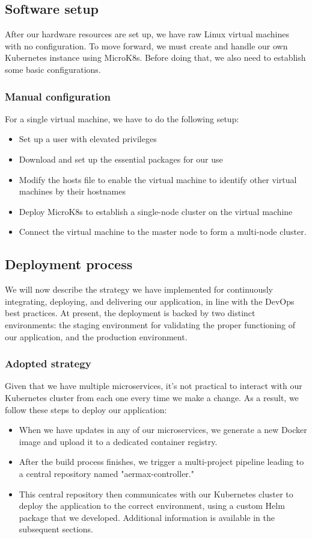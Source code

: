 \subsection{Software setup}
After our hardware resources are set up, we have raw Linux virtual machines with no configuration. To move forward, we must create and handle our own Kubernetes instance using MicroK8s. Before doing that, we also need to establish some basic configurations.

\subsubsection{Manual configuration}
For a single virtual machine, we have to do the following setup:

\begin{itemize}
  \item Set up a user with elevated privileges
  \item Download and set up the essential packages for our use
  \item Modify the hosts file to enable the virtual machine to identify other virtual machines by their hostnames
  \item Deploy MicroK8s to establish a single-node cluster on the virtual machine
  \item Connect the virtual machine to the master node to form a multi-node cluster.
\end{itemize}

\subsection{Deployment process}
We will now describe the strategy we have implemented for continuously integrating, deploying, and delivering our application, in line with the DevOps best practices. At present, the deployment is backed by two distinct environments: the staging environment for validating the proper functioning of our application, and the production environment.

\subsubsection{Adopted strategy}
Given that we have multiple microservices, it's not practical to interact with our Kubernetes cluster from each one every time we make a change. As a result, we follow these steps to deploy our application:

\begin{itemize}
  \item When we have updates in any of our microservices, we generate a new Docker image and upload it to a dedicated container registry.
  \item After the build process finishes, we trigger a multi-project pipeline leading to a central repository named "aermax-controller."
  \item This central repository then communicates with our Kubernetes cluster to deploy the application to the correct environment, using a custom Helm package that we developed. Additional information is available in the subsequent sections.

\end{itemize}

